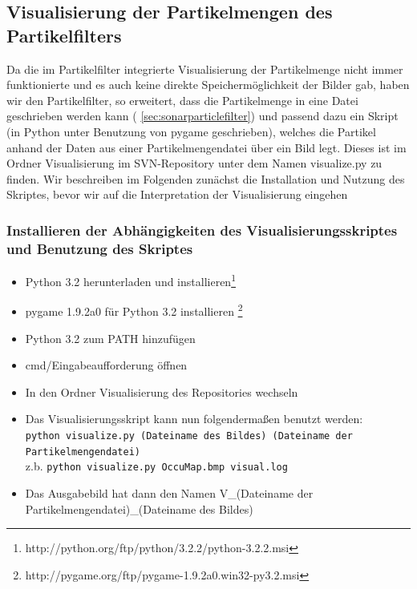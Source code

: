 \subsection{Visualisierung der Partikelmengen des Partikelfilters}
Da die im Partikelfilter integrierte Visualisierung der Partikelmenge
nicht immer funktionierte und es auch keine direkte Speichermöglichkeit der
 Bilder gab, haben wir den Partikelfilter, so erweitert, dass die
Partikelmenge in eine Datei geschrieben werden kann (
\ref{sec:sonarparticlefilter}) und passend dazu ein Skript (in Python unter
 Benutzung von pygame geschrieben), welches die Partikel anhand der Daten
 aus einer Partikelmengendatei über ein Bild legt. Dieses ist im Ordner
 Visualisierung im SVN-Repository unter dem Namen visualize.py zu finden.
Wir beschreiben im Folgenden zunächst die Installation und Nutzung des
Skriptes, bevor wir auf die Interpretation der Visualisierung eingehen
 \subsubsection{Installieren der Abhängigkeiten des
Visualisierungsskriptes und Benutzung des Skriptes}
 \begin{itemize}
	 \item Python 3.2 herunterladen und installieren\footnote{http://python.org/ftp/python/3.2.2/python-3.2.2.msi}
	 \item pygame 1.9.2a0 für Python 3.2 installieren \footnote{http://pygame.org/ftp/pygame-1.9.2a0.win32-py3.2.msi}
	 \item Python 3.2 zum PATH hinzufügen
	 \item cmd/Eingabeaufforderung öffnen
	 \item In den Ordner Visualisierung des Repositories wechseln
	 \item Das Visualisierungsskript kann nun folgendermaßen benutzt werden:\\
	 		\lstinline|python visualize.py (Dateiname des Bildes) (Dateiname der Partikelmengendatei)| \\
 			z.b. \lstinline|python visualize.py OccuMap.bmp visual.log|
	 \item Das Ausgabebild hat dann den Namen V\_(Dateiname der Partikelmengendatei)\_(Dateiname des Bildes)
\end{itemize}
